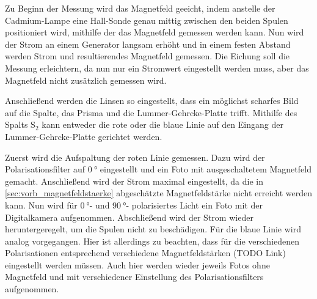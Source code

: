 Zu Beginn der Messung wird das Magnetfeld geeicht,
indem anstelle der Cadmium-Lampe eine Hall-Sonde genau mittig zwischen den beiden Spulen positioniert wird,
mithilfe der das Magnetfeld gemessen werden kann.
Nun wird der Strom an einem Generator langsam erhöht und in einem festen Abstand werden Strom und resultierendes Magnetfeld gemessen.
Die Eichung soll die Messung erleichtern,
da nun nur ein Stromwert eingestellt werden muss,
aber das Magnetfeld nicht zusätzlich gemessen wird.

Anschließend werden die Linsen so eingestellt,
dass ein möglichst scharfes Bild auf die Spalte, das Prisma und die Lummer-Gehrcke-Platte trifft.
Mithilfe des Spalts $\mathrm{S_2}$ kann entweder die rote oder die blaue Linie auf den Eingang der Lummer-Gehrcke-Platte gerichtet werden.

Zuerst wird die Aufspaltung der roten Linie gemessen.
Dazu wird der Polarisationsfilter auf $\SI{0}{\degree}$ eingestellt und ein Foto mit ausgeschaltetem Magnetfeld gemacht.
Anschließend wird der Strom maximal eingestellt,
da die in \autoref{sec:vorb_magnetfeldstaerke} abgeschätzte Magnetfeldstärke nicht erreicht werden kann.
Nun wird für $\SI{0}{\degree}$- und $\SI{90}{\degree}$- polarisiertes Licht ein Foto mit der Digitalkamera aufgenommen.
Abschließend wird der Strom wieder heruntergeregelt,
um die Spulen nicht zu beschädigen.
Für die blaue Linie wird analog vorgegangen.
Hier ist allerdings zu beachten,
dass für die verschiedenen Polarisationen entsprechend verschiedene Magnetfeldstärken (TODO Link) eingestellt werden müssen.
Auch hier werden wieder jeweils Fotos ohne Magnetfeld und mit verschiedener Einstellung des Polarisationsfilters aufgenommen.
